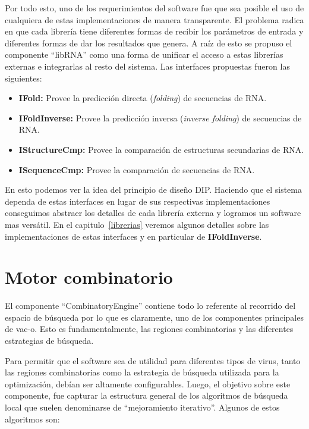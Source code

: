 Por todo esto, uno de los requerimientos del software fue que sea posible el uso
de cualquiera de estas implementaciones de manera transparente. El problema
radica en que cada librer\'ia tiene diferentes formas de recibir los
par\'ametros de entrada y diferentes formas de dar los resultados que genera. A
ra\'iz de esto se propuso el componente ``libRNA'' como una forma de unificar el
acceso a estas librer\'ias externas e integrarlas al resto del sistema. Las
interfaces propuestas fueron las siguientes:

\begin{itemize}
 \item \textbf{IFold:} Provee la predicci\'on directa (\textit{folding})
de secuencias de \ac{RNA}.
 \item \textbf{IFoldInverse:} Provee la predicci\'on inversa (\textit{inverse
folding}) de secuencias de \ac{RNA}.
 \item \textbf{IStructureCmp:} Provee la comparaci\'on de estructuras
secundarias
de \ac{RNA}.
 \item \textbf{ISequenceCmp:} Provee la comparaci\'on de secuencias de
\ac{RNA}.
\end{itemize}

En esto podemos ver la idea del principio de dise\~no \ac{DIP}. Haciendo que el
sistema dependa de estas interfaces en lugar de sus respectivas
implementaciones conseguimos abstraer los detalles de cada librer\'ia externa y
logramos un software mas vers\'atil. En el capitulo~\ref{librerias} veremos
algunos detalles sobre las implementaciones de estas interfaces y en particular
de \textbf{IFoldInverse}.

\section{Motor combinatorio}

El componente ``CombinatoryEngine'' contiene todo lo referente al recorrido del
espacio de b\'usqueda por lo que es claramente, uno de los componentes
principales de \ac{vac-o}. Esto es fundamentalmente, las regiones
combinatorias y las diferentes estrategias de b\'usqueda.

Para permitir que el software sea de utilidad para diferentes tipos de virus,
tanto las regiones combinatorias como la estrategia de b\'usqueda utilizada
para la optimizaci\'on, deb\'ian ser altamente configurables. Luego, el
objetivo sobre este componente, fue capturar la estructura general de los
algoritmos de b\'usqueda local que suelen denominarse de ``mejoramiento
iterativo''. Algunos de estos algoritmos son:

